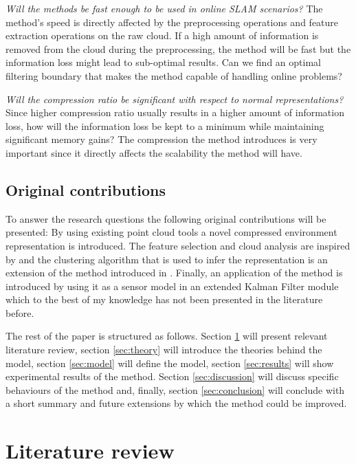 \documentclass [twoside,hidelinks]{article}
\begin{document}
\textit{Will the methods be fast enough to be used in online SLAM scenarios? }
The method's speed is directly affected by the preprocessing operations and feature extraction operations on the raw cloud. If a high amount of information is removed from the cloud during the preprocessing, the method will be fast but the information loss might lead to sub-optimal results. Can we find an optimal filtering boundary that makes the method capable of handling online problems?

\textit{Will the compression ratio be significant with respect to normal representations?}
Since higher compression ratio usually results in a higher amount of information loss, how will the information loss be kept to a minimum while maintaining significant memory gains? The compression the method introduces is very important since it directly affects the scalability the method will have. 

\subsection{Original contributions}

To answer the research questions the following original contributions will be presented:
By using existing point cloud tools \cite{pcl} a novel compressed environment representation is introduced.
The feature selection and cloud analysis are inspired by \cite{objectpointSLAM} and the clustering algorithm that is used to infer the representation is an extension of the method introduced in \cite{smcddp}.
Finally, an application of the method is introduced by using it as a sensor model in an extended Kalman Filter module which to the best of my knowledge has not been presented in the literature before.


The rest of the paper is structured as follows. Section \ref{sec:literature} will present relevant literature review, section \ref{sec:theory} will introduce the theories behind the model, section \ref{sec:model} will define the model, section \ref{sec:results} will show experimental results of the method. Section \ref{sec:discussion} will discuss specific behaviours of the method and, finally, section \ref{sec:conclusion} will conclude with a short summary and future extensions by which the method could be improved.


\newpage
\section{Literature review}
\label{sec:literature}
\end{document}
